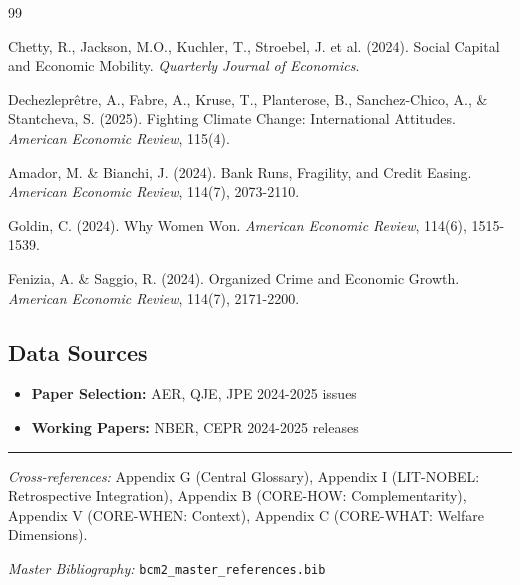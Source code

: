 \begin{thebibliography}{99}

 Chetty, R., Jackson, M.O., Kuchler, T., Stroebel, J. et al. (2024). Social Capital and Economic Mobility. \textit{Quarterly Journal of Economics}.

 Dechezleprêtre, A., Fabre, A., Kruse, T., Planterose, B., Sanchez-Chico, A., \& Stantcheva, S. (2025). Fighting Climate Change: International Attitudes. \textit{American Economic Review}, 115(4).

 Amador, M. \& Bianchi, J. (2024). Bank Runs, Fragility, and Credit Easing. \textit{American Economic Review}, 114(7), 2073-2110.

 Goldin, C. (2024). Why Women Won. \textit{American Economic Review}, 114(6), 1515-1539.

 Fenizia, A. \& Saggio, R. (2024). Organized Crime and Economic Growth. \textit{American Economic Review}, 114(7), 2171-2200.

\end{thebibliography}

\subsection{Data Sources}

\begin{itemize}[nosep]
    \item \textbf{Paper Selection:} AER, QJE, JPE 2024-2025 issues
    \item \textbf{Working Papers:} NBER, CEPR 2024-2025 releases
\end{itemize}



\vspace{1em}
\hrule
\vspace{0.5em}

\noindent\textit{Cross-references:}
Appendix G (Central Glossary),
Appendix I (LIT-NOBEL: Retrospective Integration),
Appendix B (CORE-HOW: Complementarity),
Appendix V (CORE-WHEN: Context),
Appendix C (CORE-WHAT: Welfare Dimensions).

\noindent\textit{Master Bibliography:} \texttt{bcm2\_master\_references.bib}



